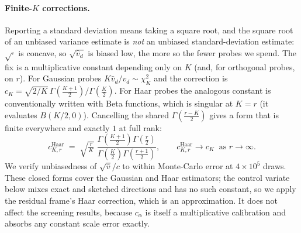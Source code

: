 \documentclass{article}
\begin{document}
\paragraph{Finite-$K$ corrections.}
Reporting a standard deviation means taking a square root, and the square root of an unbiased
variance estimate is \emph{not} an unbiased standard-deviation estimate: $\sqrt{\cdot}$ is concave,
so $\sqrt{\widehat v_d}$ is biased low, the more so the fewer probes we spend. The fix is a
multiplicative constant depending only on $K$ (and, for orthogonal probes, on $r$).
For Gaussian probes $K\widehat v_d/v_d\sim\chi^2_K$ and the
correction is $c_K=\sqrt{2/K}\,\Gamma(\tfrac{K+1}{2})/\Gamma(\tfrac K2)$. For Haar probes the
analogous constant is conventionally written with Beta functions, which is singular at $K=r$
(it evaluates $B(K/2,0)$). Cancelling the shared $\Gamma(\tfrac{r-K}{2})$ gives a form that is
finite everywhere and exactly $1$ at full rank:
\begin{equation}
c^{\mathrm{Haar}}_{K,r}\;=\;\sqrt{\tfrac{r}{K}}\;
\frac{\Gamma\!\left(\tfrac{K+1}{2}\right)\Gamma\!\left(\tfrac r2\right)}
     {\Gamma\!\left(\tfrac K2\right)\Gamma\!\left(\tfrac{r+1}{2}\right)} ,
\qquad c^{\mathrm{Haar}}_{K,r}\to c_K \ \text{ as } r\to\infty .
\end{equation}
We verify unbiasedness of $\sqrt{\widehat v}/c$ to within Monte-Carlo error at $4\times10^5$ draws.
These closed forms cover the Gaussian and Haar estimators; the control variate below mixes exact and
sketched directions and has no such constant, so we apply the residual frame's Haar correction,
which is an approximation. It does not affect the screening results, because $c_\alpha$ is itself a
multiplicative calibration and absorbs any constant scale error exactly.
\end{document}
